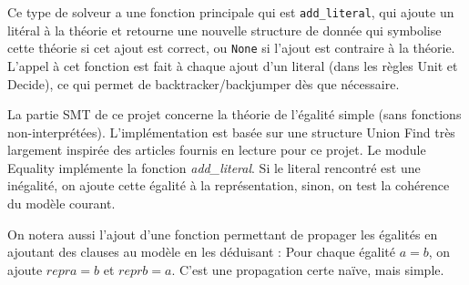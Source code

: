 \documentclass{article}
\begin{document}
Ce type de solveur a une fonction principale qui est
\texttt{add\_literal}, qui ajoute un litéral à la théorie et retourne
une nouvelle structure de donnée qui symbolise cette théorie si cet
ajout est correct, ou \texttt{None} si l'ajout est contraire à la
théorie. L'appel à cet fonction est fait à chaque ajout d'un literal
(dans les règles Unit et Decide), ce qui permet de
backtracker/backjumper dès que nécessaire.

\medskip

La partie SMT de ce projet concerne la théorie de l'égalité simple
(sans fonctions non-interprétées). L'implémentation est basée sur une
structure Union Find très largement inspirée des articles fournis en
lecture pour ce projet. Le module Equality implémente la fonction
\emph{add_literal}. Si le literal rencontré est une inégalité, on
ajoute cette égalité à la représentation, sinon, on test la cohérence
du modèle courant.

On notera aussi l'ajout d'une fonction permettant de propager les
égalités en ajoutant des clauses au modèle en les déduisant : Pour
chaque égalité $a = b$, on ajoute $repr a = b$ et $repr b = a$. C'est
une propagation certe naïve, mais simple.
\end{document}
